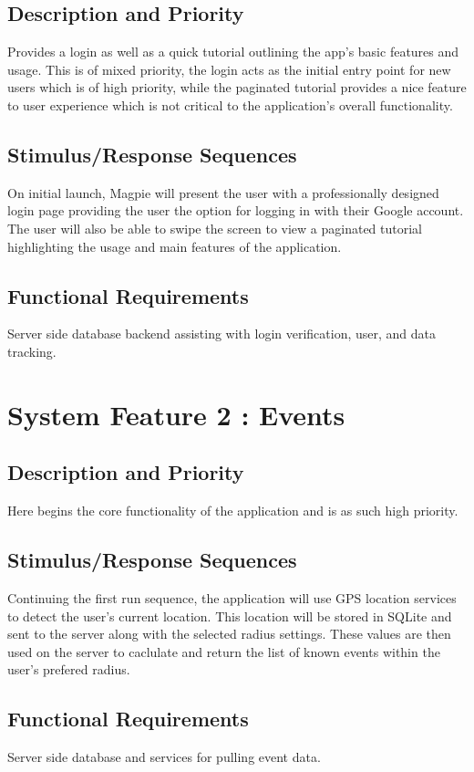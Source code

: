 \documentclass{scrreprt}
\begin{document}
\subsection{Description and Priority}
Provides a login as well as a quick tutorial outlining the app's  basic features and
usage. This is of mixed priority, the login acts as the initial entry point for new users
which is of high priority, while the paginated tutorial provides a nice feature to user
experience which is not critical to the application's overall functionality.

\subsection{Stimulus/Response Sequences}
On initial launch, Magpie will present the user with a professionally designed login
page providing the user the option for logging in with their Google account. The user
will also be able to swipe the screen to view a paginated tutorial highlighting the
usage and main features of the application.

\subsection{Functional Requirements}
Server side database backend assisting with login verification, user, and data tracking.

\section{System Feature 2 : Events}

\subsection{Description and Priority}
Here begins the core functionality of the application and is as such high priority.

\subsection{Stimulus/Response Sequences}
Continuing the first run sequence, the application will use GPS location services to detect the user's current location.
This location will be stored in SQLite and sent to the server along with the selected radius settings.
These values are then used on the server to caclulate and return the list of known events within the user's prefered radius.

\subsection{Functional Requirements}
Server side database and services for pulling event data.
\end{document}
